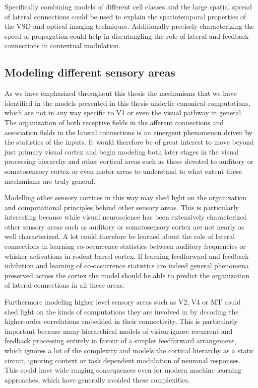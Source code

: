 Specifically combining models of different cell classes and the large
spatial spread of lateral connections could be used to explain the
spatiotemporal properties of the VSD and optical imaging
techniques. Additionally precisely characterizing the speed of
propagation could help in disentangling the role of lateral and
feedback connections in contextual modulation.

\subsection{Modeling different sensory areas}

As we have emphasized throughout this thesis the mechanisms that we
have identified in the models presented in this thesis underlie
canonical computations, which are not in any way specific to V1 or
even the visual pathway in general. The organization of both receptive
fields in the afferent connections and association fields in the
lateral connections is an emergent phenomenon driven by the statistics
of the inputs. It would therefore be of great interest to move beyond
just primary visual cortex and begin modeling both later stages in the
visual processing hierarchy and other cortical areas such as those
devoted to auditory or somatosensory cortex or even motor areas to
understand to what extent these mechanisms are truly general.

Modelling other sensory cortices in this way may shed light on the
organization and computational principles behind other sensory
areas. This is particularly interesting because while visual
neuroscience has been extensively characterized other sensory areas
such as auditory or somatosensory cortex are not nearly as well
characterized. A lot could therefore be learned about the role of
lateral connections in learning co-occurrence statistics between
auditory frequencies or whisker activations in rodent barrel
cortex. If learning feedforward and feedback inhibition and learning
of co-occurrence statistics are indeed general phenomena preserved
across the cortex the model should be able to predict the organization
of lateral connections in all these areas.

Furthermore modeling higher level sensory areas such as V2, V4 or MT
could shed light on the kinds of computations they are involved in by
decoding the higher-order correlations embedded in their
connectivity. This is particularly important because many hierarchical
models of vision ignore recurrent and feedback processing entirely in
favour of a simpler feedforward arrangement, which ignores a lot of
the complexity and models the cortical hierarchy as a static circuit,
ignoring context or task dependent modulation of neuronal
responses. This could have wide ranging consequences even for modern
machine learning approaches, which have generally avoided these
complexities.

